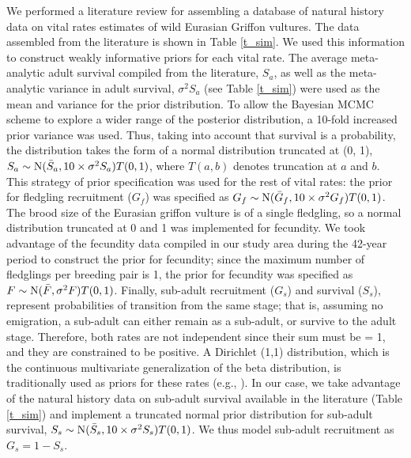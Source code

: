 \documentclass[12pt,a4paper]{article}
\begin{document}
We performed a literature review for assembling a database of natural history data on vital rates estimates of wild Eurasian Griffon vultures. The data assembled from the literature is shown in Table \ref{t_sim}. We used this information to construct weakly informative priors for each vital rate. The average meta-analytic adult survival compiled from the literature, $S_{a}$, as well as the meta-analytic variance in adult survival, $\sigma^2S_{a}$ (see Table \ref{t_sim}) were used as the mean and variance for the prior distribution. To allow the Bayesian MCMC scheme to explore a wider range of the posterior distribution, a 10-fold increased prior variance was used. Thus, taking into account that survival is a probability, the distribution takes the form of a normal distribution truncated at (0, 1), $S_{a} \sim \textnormal{N}(\bar S_{a}, 10 \times \sigma^2S_{a})T(0,1)$, where $T(a, b)$ denotes truncation at $a$ and $b$. This strategy of prior specification was used for the rest of vital rates: the prior for fledgling recruitment ($G_{f}$) was specified as $G_{f} \sim \textnormal{N}(\bar G_{f}, 10 \times \sigma^2G_{f})T(0,1)$. The brood size of the Eurasian griffon vulture is of a single fledgling, so a normal distribution truncated at 0 and 1 was implemented for fecundity. We took advantage of the fecundity data compiled in our study area during the 42-year period to construct the prior for fecundity; since the maximum number of fledglings per breeding pair is 1, the prior for fecundity was specified as $F \sim \textnormal{N}(\bar{F}, \sigma^2{F})T(0,1)$. Finally, sub-adult recruitment ($G_{s}$) and survival ($S_{s}$), represent probabilities of transition from the same stage; that is, assuming no emigration, a sub-adult can either remain as a sub-adult, or survive to the adult stage. Therefore, both rates are not independent since their sum must be = 1, and they are constrained to be positive. A Dirichlet (1,1) distribution, which is the continuous multivariate generalization of the beta distribution, is traditionally used as priors for these rates (e.g., \cite{Gross2002}). In our case, we take advantage of the natural history data on sub-adult survival available in the literature (Table \ref{t_sim}) and implement a truncated normal prior distribution for sub-adult survival, $S_{s} \sim \textnormal{N}(\bar S_{s}, 10 \times \sigma^2S_{s})T(0,1)$. We thus model sub-adult recruitment as $G_{s} = 1 - S_{s}$.\\
\end{document}
